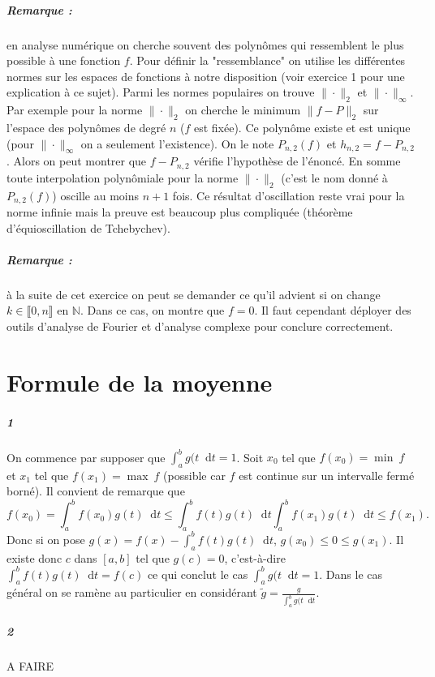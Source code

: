 \documentclass[10pt,a4paper]{article}
\newcommand{\intt}[4]{\int_{#1}^{#2} #3 \mathop{}\!\mathrm{d} #4}
\begin{document}
\subparagraph{Remarque :} en analyse numérique on cherche souvent des polynômes qui ressemblent le plus possible à une fonction $f$. Pour définir la "ressemblance" on utilise les différentes normes sur les espaces de fonctions à notre disposition (voir exercice 1 pour une explication à ce sujet). Parmi les normes populaires on trouve $\| \cdot \|_2$ et $\| \cdot \|_{\infty}$. Par exemple pour la norme $\| \cdot \|_2$ on cherche le minimum $\| f - P \|_2$ sur l'espace des polynômes de degré $n$ ($f$ est fixée). Ce polynôme existe et est unique (pour $\| \cdot \|_{\infty}$ on a seulement l'existence). On le note $P_{n,2}(f)$ et $h_{n,2} = f-P_{n,2}$. Alors on peut montrer que $f - P_{n,2}$ vérifie l'hypothèse de l'énoncé. En somme toute interpolation polynômiale pour la norme $\| \cdot \|_2$ (c'est le nom donné à $P_{n,2}(f)$) oscille au moins $n+1$ fois. Ce résultat d'oscillation reste vrai pour la norme infinie mais la preuve est beaucoup plus compliquée (théorème d'équioscillation de Tchebychev). 

\subparagraph{Remarque :} à la suite de cet exercice on peut se demander ce qu'il advient si on change $k \in \llbracket 0,n\rrbracket$ en $\mathbb{N}$. Dans ce cas, on montre que $f=0$. Il faut cependant déployer des outils d'analyse de Fourier et d'analyse complexe pour conclure correctement.
\section{Formule de la moyenne}
\subparagraph{1} On commence par supposer que $\intt{a}{b}{g(t}{t} = 1$. Soit $x_0$ tel que $f(x_0) = \min \ f$ et $x_1$ tel que $f(x_1) = \max \ f$ (possible car $f$ est continue sur un intervalle fermé borné). Il convient de remarque que
\[
f(x_0) = \intt{a}{b}{f(x_0)g(t)}{t} \le \intt{a}{b}{f(t)g(t)}{t} \intt{a}{b}{f(x_1)g(t)}{t} \le f(x_1).
\]
Donc si on pose $g(x) = f(x) - \intt{a}{b}{f(t)g(t)}{t}$, $g(x_0) \le 0 \le g(x_1)$. Il existe donc $c$ dans $[a,b]$ tel que $g(c) = 0$, c'est-à-dire $\intt{a}{b}{f(t)g(t)}{t} = f(c)$ ce qui conclut le cas  $\intt{a}{b}{g(t}{t} = 1$. Dans le cas général on se ramène au particulier en considérant $\tilde{g} = \frac{g}{\intt{a}{b}{g(t}{t}}$.
\subparagraph{2} A FAIRE
\end{document}
